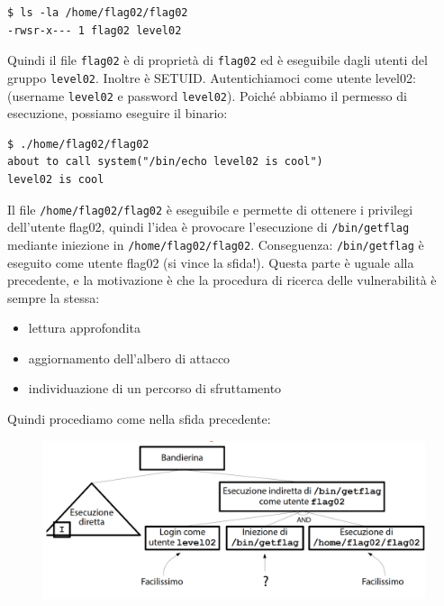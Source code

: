 \begin{mdframed}[backgroundcolor=white!20,shadow=false]
\begin{lstlisting}
$ ls -la /home/flag02/flag02
-rwsr-x--- 1 flag02 level02
\end{lstlisting}
\end{mdframed}
Quindi il file \texttt{flag02} è di proprietà di \texttt{flag02} ed è eseguibile dagli utenti del gruppo \texttt{level02}. Inoltre è SETUID. Autentichiamoci come utente level02: (username \texttt{level02} e password \texttt{level02}). Poiché abbiamo il permesso di esecuzione, possiamo eseguire il binario:

\begin{mdframed}[backgroundcolor=white!20,shadow=false]
\begin{lstlisting}
$ ./home/flag02/flag02
about to call system("/bin/echo level02 is cool")
level02 is cool
\end{lstlisting}
\end{mdframed}

Il file \texttt{/home/flag02/flag02} è
eseguibile e permette di ottenere i privilegi
dell'utente flag02, quindi l'idea è provocare l'esecuzione di \texttt{/bin/getflag}
mediante iniezione in \texttt{/home/flag02/flag02}. Conseguenza: \texttt{/bin/getflag} è eseguito come
utente flag02 (si vince la sfida!). Questa parte è uguale alla precedente, e la motivazione è che la procedura di ricerca delle vulnerabilità è sempre la stessa:
\begin{itemize}
    \item lettura approfondita
    \item aggiornamento dell'albero di attacco
    \item individuazione di un percorso di sfruttamento
\end{itemize}
Quindi procediamo come nella sfida precedente:

\begin{figure}[hbpt!]
    \centering
    \includegraphics[width=0.8 \textwidth]{./Images/cap5/5.7.png}
\end{figure}
\FloatBarrier

